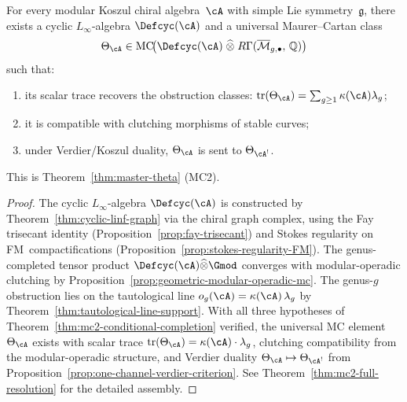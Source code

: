 \begin{theorem}
\label{thm:universal-theta}
For every modular Koszul chiral algebra~$\cA$ with simple Lie
symmetry~$\mathfrak{g}$, there exists a
cyclic $L_\infty$-algebra $\Defcyc(\cA)$ and a universal
Maurer--Cartan class
\[
\Theta_{\cA} \in
\operatorname{MC}\!\bigl(
  \Defcyc(\cA) \;\widehat{\otimes}\;
  R\Gamma(\overline{\mathcal{M}}_{g,\bullet},\, \mathbb{Q})
\bigr)
\]
such that:
\begin{enumerate}[label=\textup{(\roman*)}]
\item its scalar trace recovers the obstruction classes:
  $\operatorname{tr}(\Theta_{\cA})
  = \sum_{g \geq 1} \kappa(\cA) \lambda_g$;
\item it is compatible with clutching morphisms of stable curves;
\item under Verdier/Koszul duality, $\Theta_{\cA}$ is sent to
  $\Theta_{\cA^!}$.
\end{enumerate}
This is Theorem~\ref{thm:master-theta} (MC2).
\end{theorem}

\begin{proof}
The cyclic $L_\infty$-algebra $\Defcyc(\cA)$ is constructed by
Theorem~\ref{thm:cyclic-linf-graph} via the chiral graph complex,
using the Fay trisecant identity
(Proposition~\ref{prop:fay-trisecant}) and Stokes regularity on
FM~compactifications
(Proposition~\ref{prop:stokes-regularity-FM}).
The genus-completed tensor product
$\Defcyc(\cA) \widehat{\otimes} \Gmod$ converges with
modular-operadic clutching by
Proposition~\ref{prop:geometric-modular-operadic-mc}.
The genus-$g$ obstruction lies on the tautological line
$o_g(\cA) = \kappa(\cA)\,\lambda_g$ by
Theorem~\ref{thm:tautological-line-support}.
With all three hypotheses of
Theorem~\ref{thm:mc2-conditional-completion} verified,
the universal MC element $\Theta_{\cA}$ exists with
scalar trace $\operatorname{tr}(\Theta_{\cA})
= \kappa(\cA) \cdot \lambda_g$, clutching compatibility from the
modular-operadic structure, and Verdier duality
$\Theta_{\cA} \mapsto \Theta_{\cA^!}$ from
Proposition~\ref{prop:one-channel-verdier-criterion}.
See Theorem~\ref{thm:mc2-full-resolution} for the detailed
assembly.
\end{proof}

